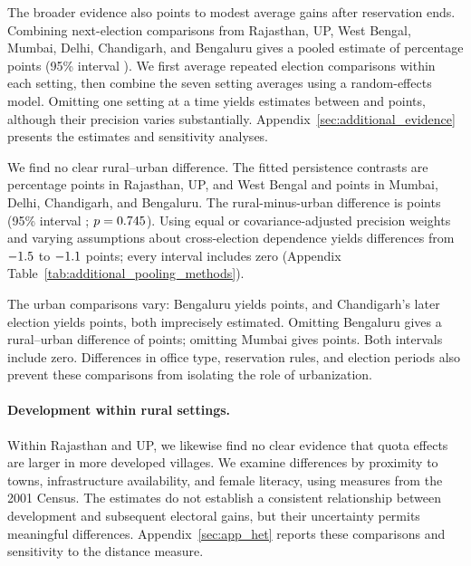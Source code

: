 \documentclass[11pt]{article}
\begin{document}
The broader evidence also points to modest average gains after reservation ends. Combining next-election comparisons from Rajasthan, UP, West Bengal, Mumbai, Delhi, Chandigarh, and Bengaluru gives a pooled estimate of \appMetaEstimate{} percentage points (95\% interval \appMetaInterval{}). We first average repeated election comparisons within each setting, then combine the seven setting averages using a random-effects model. Omitting one setting at a time yields estimates between \appMetaOmitLow{} and \appMetaOmitHigh{} points, although their precision varies substantially. Appendix~\ref{sec:additional_evidence} presents the estimates and sensitivity analyses.

We find no clear rural--urban difference. The fitted persistence contrasts are \appRuralMean{} percentage points in Rajasthan, UP, and West Bengal and \appUrbanMean{} points in Mumbai, Delhi, Chandigarh, and Bengaluru. The rural-minus-urban difference is \appRuralGap{} points (95\% interval \appRuralGapInterval{}; $p=0.745{}$). Using equal or covariance-adjusted precision weights and varying assumptions about cross-election dependence yields differences from $-1.5{}$ to $-1.1{}$ points; every interval includes zero (Appendix Table~\ref{tab:additional_pooling_methods}).

The urban comparisons vary: Bengaluru yields \appBengaluruEstimate{} points, and Chandigarh's later election yields \appChandigarhLaterEstimate{} points, both imprecisely estimated. Omitting Bengaluru gives a rural--urban difference of \appRuralGapOmitBengaluru{} points; omitting Mumbai gives \appRuralGapOmitMumbai{} points. Both intervals include zero. Differences in office type, reservation rules, and election periods also prevent these comparisons from isolating the role of urbanization.

\paragraph{Development within rural settings.}\label{sec:het_effects}
Within Rajasthan and UP, we likewise find no clear evidence that quota effects are larger in more developed villages. We examine differences by proximity to towns, infrastructure availability, and female literacy, using measures from the 2001 Census. The estimates do not establish a consistent relationship between development and subsequent electoral gains, but their uncertainty permits meaningful differences. Appendix~\ref{sec:app_het} reports these comparisons and sensitivity to the distance measure.
\end{document}
